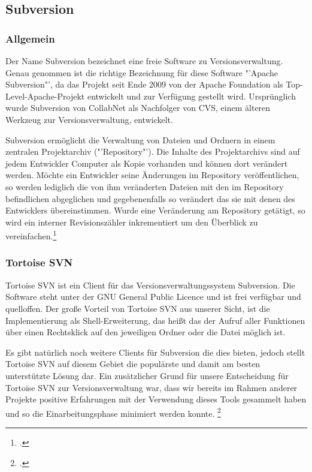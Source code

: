 \subsection{Subversion}
\subsubsection{Allgemein}
Der Name Subversion bezeichnet eine freie Software zu Versionsverwaltung. Genau genommen ist die richtige Bezeichnung für diese Software "'Apache Subversion"', da das Projekt seit Ende 2009 von der Apache Foundation als Top-Level-Apache-Projekt entwickelt und zur Verfügung gestellt wird. Ursprünglich wurde Subversion von CollabNet als Nachfolger von CVS, einem älteren Werkzeug zur Versionsverwaltung, entwickelt.

Subversion ermöglicht die Verwaltung von Dateien und Ordnern in einem zentralen Projektarchiv ("'Repository"'). Die Inhalte des Projektarchivs sind auf jedem Entwickler Computer als Kopie vorhanden und können dort verändert werden. 
Möchte ein Entwickler seine Änderungen im Repository veröffentlichen, so werden lediglich die von ihm veränderten Dateien mit den im Repository befindlichen abgeglichen und gegebenenfalls so verändert das sie mit denen des Entwicklers übereinstimmen. Wurde eine Veränderung am Repository getätigt, so wird ein interner Revisionszähler inkrementiert um den Überblick zu vereinfachen.\footcite[vgl.][]{apache}

\subsubsection{Tortoise SVN}
Tortoise SVN ist ein Client für das Versionsverwaltungssystem Subversion. Die Software steht unter der GNU General Public Licence und ist frei verfügbar und quelloffen. Der große Vorteil von Tortoise SVN aus unserer Sicht, ist die Implementierung als Shell-Erweiterung, das heißt das der Aufruf aller Funktionen über einen Rechtsklick auf den jeweiligen Ordner oder die Datei möglich ist.

Es gibt natürlich noch weitere Clients für Subversion die dies bieten, jedoch stellt Tortoise SVN auf diesem Gebiet die populärste und damit am besten unterstützte Lösung dar. Ein zusätzlicher Grund für unsere Entscheidung für Tortoise SVN zur Versionsverwaltung war, dass wir bereits im Rahmen anderer Projekte positive Erfahrungen mit der Verwendung dieses Tools gesammelt haben und so die Einarbeitungsphase minimiert werden konnte. \footcite[vgl.][]{tsvn}
